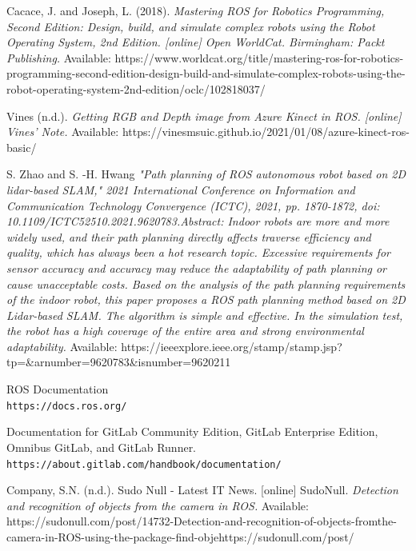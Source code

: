 \documentclass[twoside,12pt,times,onecolumn,a4paper]{report}
\begin{document}
\begin{thebibliography}{9}
Cacace, J. and Joseph, L. (2018). 
\textit{Mastering ROS for Robotics Programming, 
Second Edition: Design, build, and simulate complex robots using the Robot 
Operating System, 2nd Edition. [online] Open WorldCat. Birmingham: Packt 
Publishing. }
Available:  https://www.worldcat.org/title/mastering-ros-for-robotics-programming-second-edition-design-build-and-simulate-complex-robots-using-the-robot-operating-system-2nd-edition/oclc/102818037/

Vines (n.d.). 
\textit{Getting RGB and Depth image from Azure Kinect in ROS. [online] 
Vines’ Note.}
Available: https://vinesmsuic.github.io/2021/01/08/azure-kinect-ros-basic/


S. Zhao and S. -H. Hwang
\textit{"Path planning of ROS autonomous robot based on 2D lidar-based SLAM," 2021 International Conference on Information and Communication Technology Convergence (ICTC), 2021, pp. 1870-1872, doi: 10.1109/ICTC52510.2021.9620783.Abstract: Indoor robots are more and more widely used, and their path planning directly affects traverse efficiency and quality, which has always been a hot research topic. Excessive requirements for sensor accuracy and accuracy may reduce the adaptability of path planning or cause unacceptable costs. Based on the analysis of the path planning requirements of the indoor robot, this paper proposes a ROS path planning method based on 2D Lidar-based SLAM. The algorithm is simple and effective. In the simulation test, the robot has a high coverage of the entire area and strong environmental adaptability. }
Available: https://ieeexplore.ieee.org/stamp/stamp.jsp?tp=\&arnumber=9620783\&isnumber=9620211




ROS Documentation
\\\texttt{https://docs.ros.org/}

 Documentation for GitLab Community Edition, GitLab Enterprise Edition, Omnibus GitLab, and GitLab Runner.
\\\texttt{https://about.gitlab.com/handbook/documentation/}

Company, S.N. (n.d.). Sudo Null - Latest IT News. [online] SudoNull. 
\textit{Detection and recognition of objects from the camera in ROS.}
Available: https://sudonull.com/post/14732-Detection-and-recognition-of-objects-fromthe-camera-in-ROS-using-the-package-find-objehttps://sudonull.com/post/

\end{thebibliography}
\end{document}
